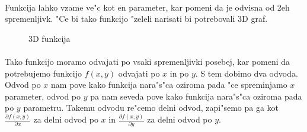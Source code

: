 \paragraph{}
Funkcija lahko vzame ve"c kot en parameter, kar pomeni da je odvisna od 2eh spremenljivk. "Ce bi tako funkcijo "zeleli narisati bi potrebovali 3D graf.

\begin{figure}[h!]
	\centering
	\caption{3D funkcija}
\end{figure}

\paragraph{}
Tako funkcijo moramo odvajati po vsaki spremenljivki posebej, kar pomeni da potrebujemo funkcijo $f(x,y)$ odvajati po $x$ in po $y$. S tem dobimo dva odvoda. Odvod po $x$ nam pove kako funkcija nara"s"ca oziroma pada "ce spreminjamo $x$ parameter, odvod po $y$ pa nam seveda pove kako funkcija nara"s"ca oziroma pada po $y$ parametru. Takemu odvodu re"cemo delni odvod, zapi"semo pa ga kot $\frac{\partial f(x,y)}{\partial x}$ za delni odvod po $x$ in $\frac{\partial f(x,y)}{\partial y}$ za delni odvod po $y$.